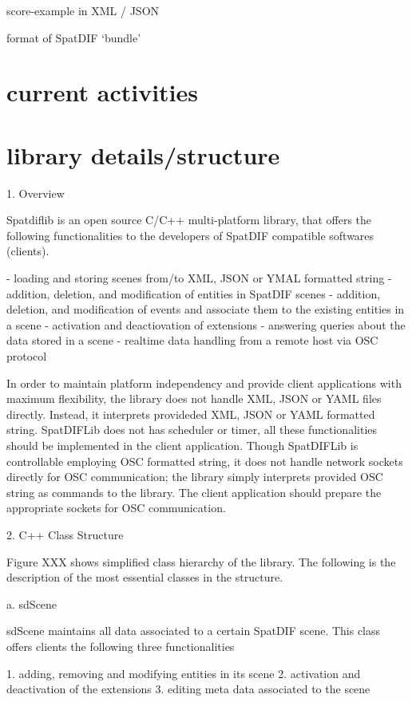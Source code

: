 \documentclass{article}
\begin{document}
score-example in XML / JSON

format of SpatDIF `bundle'

\section{current activities} %

\section{library details/structure} %
1. Overview

Spatdiflib is an open source C/C++ multi-platform library, that offers the following functionalities to the developers of SpatDIF compatible softwares (clients).

- loading and storing scenes from/to XML, JSON or YMAL formatted string
- addition, deletion, and modification of entities in SpatDIF scenes
- addition, deletion, and modification of events and associate them to the existing entities in a scene
- activation and deactiovation of extensions
- answering queries about the data stored in a scene
- realtime data handling from a remote host via OSC protocol

In order to maintain platform independency and provide client applications with maximum flexibility, the library does not handle XML, JSON or YAML files directly. Instead, it interprets provideded XML, JSON or YAML formatted string.  SpatDIFLib does not has scheduler or timer, all these functionalities should be implemented in the client application. Though SpatDIFLib is controllable employing OSC formatted string, it does not handle network sockets directly for OSC communication; the library simply interprets provided OSC string as commands to the library.  The client application should prepare the appropriate sockets for OSC communication.


2. C++ Class Structure



Figure XXX shows simplified class hierarchy of the library. The following is the description of the most essential classes in the structure.

a. sdScene

sdScene maintains all data associated to a certain SpatDIF scene. This class offers clients the following three functionalities

1. adding, removing and modifying entities in its scene
2. activation and deactivation of the extensions
3. editing meta data associated to the scene
\end{document}
